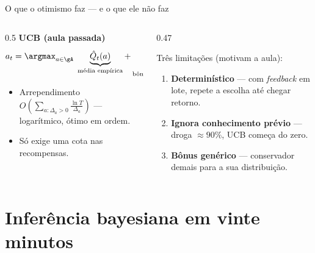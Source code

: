 \documentclass[aspectratio=169, 11pt]{beamer}
\begin{document}
\begin{frame}{O que o otimismo faz — e o que ele não faz}
  \begin{columns}[T]
    \begin{column}{0.5\textwidth}
      {\small\textbf{UCB (aula passada)}}
      \[
        a_t = \argmax_{a \in \gA}\;
          \underbrace{\hat{Q}_t(a)}_{\text{média empírica}}
          + \underbrace{\sqrt{\tfrac{2\ln t}{N_t(a)}}}_{\text{bônus de incerteza}}
      \]
      \begin{itemize}\setlength{\itemsep}{0.2ex}
        \item Arrependimento $O\!\left(\sum_{a:\Delta_a>0}
              \frac{\ln T}{\Delta_a}\right)$ — logarítmico, ótimo em ordem.
        \item Só exige uma cota nas recompensas.
      \end{itemize}
    \end{column}
    \begin{column}{0.47\textwidth}
      \begin{alertabox}
        Três limitações (motivam a aula):
        \begin{enumerate}\setlength{\itemsep}{0.2ex}
          \item \textbf{Determinístico} — com \emph{feedback} em lote,
                repete a escolha até chegar retorno.
          \item \textbf{Ignora conhecimento prévio} — droga $\approx 90\%$,
                UCB começa do zero.
          \item \textbf{Bônus genérico} — conservador demais para a sua
                distribuição.
        \end{enumerate}
      \end{alertabox}
    \end{column}
  \end{columns}
\end{frame}

\section{Inferência bayesiana em vinte minutos}
\end{document}

